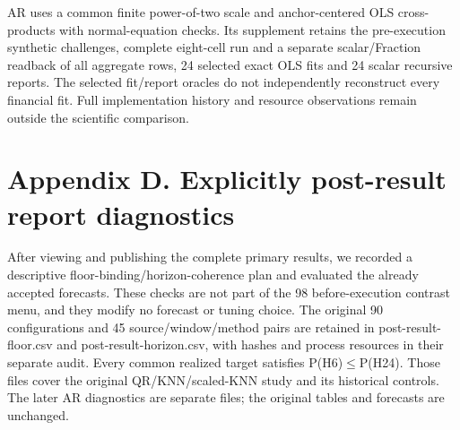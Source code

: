 \documentclass[10pt,a4paper]{article}
\begin{document}
AR uses a common finite power-of-two scale and anchor-centered OLS cross-products with normal-equation checks. Its supplement retains the pre-execution synthetic challenges, complete eight-cell run and a separate scalar/Fraction readback of all aggregate rows, 24 selected exact OLS fits and 24 scalar recursive reports. The selected fit/report oracles do not independently reconstruct every financial fit. Full implementation history and resource observations remain outside the scientific comparison.

\section*{Appendix D. Explicitly post-result report diagnostics}
After viewing and publishing the complete primary results, we recorded a descriptive floor-binding/horizon-coherence plan and evaluated the already accepted forecasts. These checks are not part of the 98 before-execution contrast menu, and they modify no forecast or tuning choice. The original 90 configurations and 45 source/window/method pairs are retained in post-result-floor.csv and post-result-horizon.csv, with hashes and process resources in their separate audit. Every common realized target satisfies P(H6)\(\le\)P(H24). Those files cover the original QR/KNN/scaled-KNN study and its historical controls. The later AR diagnostics are separate files; the original tables and forecasts are unchanged.
\end{document}
